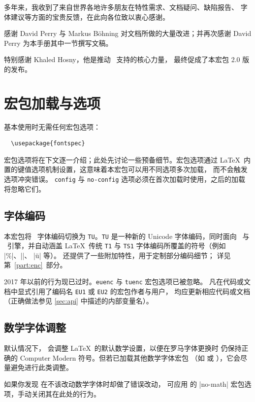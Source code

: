 \documentclass[a4paper]{l3doc}
\begin{document}
多年来，我收到了来自世界各地许多朋友在特性需求、文档疑问、缺陷报告、
字体建议等方面的宝贵反馈，在此向各位致以衷心感谢。

感谢 David Perry 与 Markus B\"ohning 对文档所做的大量改进；并再次感谢
David Perry 为本手册其中一节撰写文稿。

特别感谢 Khaled Hosny，他是推动 \LuaLaTeX\ 支持的核心力量，
最终促成了本宏包 2.0 版的发布。



\section{宏包加载与选项}

基本使用时无需任何宏包选项：
\begin{Verbatim}
  \usepackage{fontspec}
\end{Verbatim}
宏包选项将在下文逐一介绍；此处先讨论一些预备细节。宏包选项通过
\LaTeX\ 内置的键值选项机制设置，这意味着本宏包可以用不同选项多次加载，
而不会触发选项冲突错误。
\texttt{config} 与 \texttt{no-config} 选项必须在首次加载时使用，之后的加载将忽略它们。

\subsection{字体编码}

本宏包将 \NFSS\ 字体编码切换为 \texttt{TU}。\texttt{TU} 是一种新的 Unicode
字体编码，同时面向 \XeTeX\ 与 \LuaTeX\ 引擎，并自动涵盖 \LaTeX\ 传统
\texttt{T1} 与 \texttt{TS1} 字体编码所覆盖的符号（例如 |\%|、|\textbullet|、
|\"u| 等）。 还提供了一些附加特性，用于定制部分编码细节；
详见第~\vref{part:enc}~部分。

2017 年以前的行为现已过时。\texttt{euenc} 与 \texttt{tuenc} 宏包选项已被忽略。
凡在代码或文档中显式引用了编码名 \texttt{EU1} 或 \texttt{EU2} 的宏包作者与用户，
均应更新相应代码或文档（正确做法参见 \vref{sec:api} 中描述的内部变量名）。


\subsection{数学字体调整}
默认情况下， 会调整 \LaTeX\ 的默认数学设置，以便在罗马字体更换时
仍保持正确的 Computer Modern 符号。但若已加载其他数学字体宏包
（如  或 ），它会尽量避免进行此类调整。

如果你发现  在不该改动数学字体时却做了错误改动，
可应用  的 |no-math| 宏包选项，手动关闭其在此处的行为。
\end{document}
